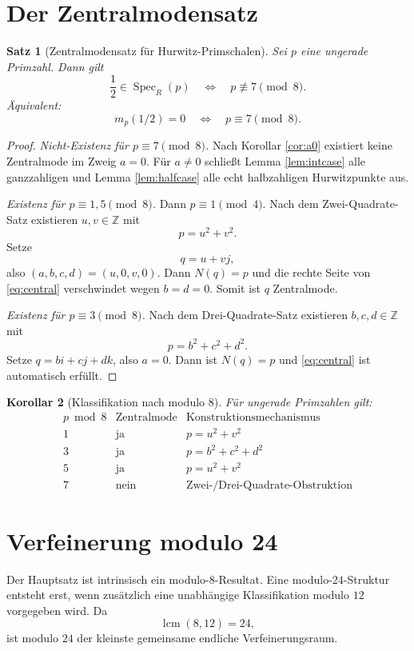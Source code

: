 \documentclass[11pt,a4paper]{article}
\newtheorem{satz}{Satz}[section]
\newtheorem{korollar}[satz]{Korollar}
\theoremstyle{definition}
\newcommand{\ZZ}{\mathbb Z}
\newcommand{\Spec}{\operatorname{Spec}}
\begin{document}
\section{Der Zentralmodensatz}\label{sec:main}
\begin{satz}[Zentralmodensatz für Hurwitz-Primschalen]\label{thm:central}
Sei $p$ eine ungerade Primzahl. Dann gilt
\begin{equation}\label{eq:main}
\boxed{
\frac12\in\Spec_R(p)
\quad\Longleftrightarrow\quad
p\not\equiv7\pmod8.}
\end{equation}
Äquivalent:
\begin{equation}\label{eq:mainmult}
\boxed{
m_p(1/2)=0
\quad\Longleftrightarrow\quad
p\equiv7\pmod8.}
\end{equation}
\end{satz}
\begin{proof}
\emph{Nicht-Existenz für $p\equiv7\pmod8$.} Nach Korollar \ref{cor:a0} existiert keine Zentralmode im Zweig $a=0$. Für $a\neq0$ schließt Lemma \ref{lem:intcase} alle ganzzahligen und Lemma \ref{lem:halfcase} alle echt halbzahligen Hurwitzpunkte aus.

\emph{Existenz für $p\equiv1,5\pmod8$.} Dann $p\equiv1\pmod4$. Nach dem Zwei-Quadrate-Satz existieren $u,v\in\ZZ$ mit
\[
p=u^2+v^2.
\]
Setze
\[
q=u+vj,
\]
also $(a,b,c,d)=(u,0,v,0)$. Dann $N(q)=p$ und die rechte Seite von \eqref{eq:central} verschwindet wegen $b=d=0$. Somit ist $q$ Zentralmode.

\emph{Existenz für $p\equiv3\pmod8$.} Nach dem Drei-Quadrate-Satz existieren $b,c,d\in\ZZ$ mit
\[
p=b^2+c^2+d^2.
\]
Setze $q=bi+cj+dk$, also $a=0$. Dann ist $N(q)=p$ und \eqref{eq:central} ist automatisch erfüllt.
\end{proof}

\begin{korollar}[Klassifikation nach modulo $8$]
Für ungerade Primzahlen gilt:
\[
\begin{array}{c|c|c}
p\bmod8 & \text{Zentralmode} & \text{Konstruktionsmechanismus}\\\hline
1 & \text{ja} & p=u^2+v^2\\
3 & \text{ja} & p=b^2+c^2+d^2\\
5 & \text{ja} & p=u^2+v^2\\
7 & \text{nein} & \text{Zwei-/Drei-Quadrate-Obstruktion}
\end{array}
\]
\end{korollar}

\section{Verfeinerung modulo 24}
Der Hauptsatz ist intrinsisch ein modulo-$8$-Resultat. Eine modulo-$24$-Struktur entsteht erst, wenn zusätzlich eine unabhängige Klassifikation modulo $12$ vorgegeben wird. Da
\[
\operatorname{lcm}(8,12)=24,
\]
ist modulo $24$ der kleinste gemeinsame endliche Verfeinerungsraum.
\end{document}
